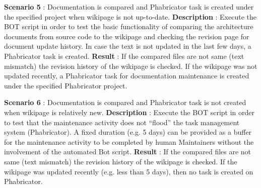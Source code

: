 \begin{mdframed}[leftmargin=10pt,rightmargin=10pt]
\textbf{Scenario 5} : Documentation is compared and Phabricator task is created under the specified project when wikipage is not up-to-date.
\newline
\textbf{Description} : Execute the BOT script in order to test the basic functionality of comparing the architecture documents from source code to the wikipage and checking the revision page for document update history. In case the text is not updated in the last few days, a Phabricator task is created.
\newline 
\newline \textbf{Result} : If the compared files are not same (text mismatch) the revision history of the wikipage is checked. If the wikipage was not updated recently, a Phabricator task for documentation maintenance is created under the specified Phabricator project.
\end{mdframed}

\begin{mdframed}[leftmargin=10pt,rightmargin=10pt]
\textbf{Scenario 6} : Documentation is compared and Phabricator task is not created when wikipage is relatively new.
\newline
\newline \textbf{Description} : Execute the BOT script in order to test that the maintenance activity does not \enquote{flood} the task management system (Phabricator). A fixed duration (e.g. 5 days) can be provided as a buffer for the maintenance activity to be completed by human Maintainers without the involvement of the automated Bot script.
\newline 
\newline \textbf{Result} : If the compared files are not same (text mismatch) the revision history of the wikipage is checked. If the wikipage was updated recently (e.g. less than 5 days), then no task is created on Phabricator.
\end{mdframed}

